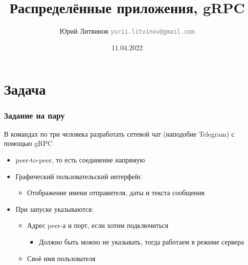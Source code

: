 \documentclass[xetex,mathserif,serif]{beamer}
\title{Распределённые приложения, gRPC}
\author[Юрий Литвинов]{Юрий Литвинов \newline \textcolor{gray}{\small\texttt{yurii.litvinov@gmail.com}}}
\date{11.04.2022}
\begin{document}
    
    \frame{\titlepage}

    \section{Задача}

    \begin{frame}
        \frametitle{Задание на пару}
        В командах по три человека разработать сетевой чат (наподобие Telegram) с помощью gRPC
        \begin{itemize}
            \item peer-to-peer, то есть соединение напрямую
            \item Графический пользовательский интерфейс
            \begin{itemize}
                \item Отображение имени отправителя, даты и текста сообщения
            \end{itemize}
            \item При запуске указываются:
            \begin{itemize}
                \item Адрес peer-а и порт, если хотим подключиться
                \begin{itemize}
                    \item Должно быть можно не указывать, тогда работаем в режиме сервера
                \end{itemize}
                \item Своё имя пользователя
            \end{itemize}
        \end{itemize}
    \end{frame}
\end{document}
